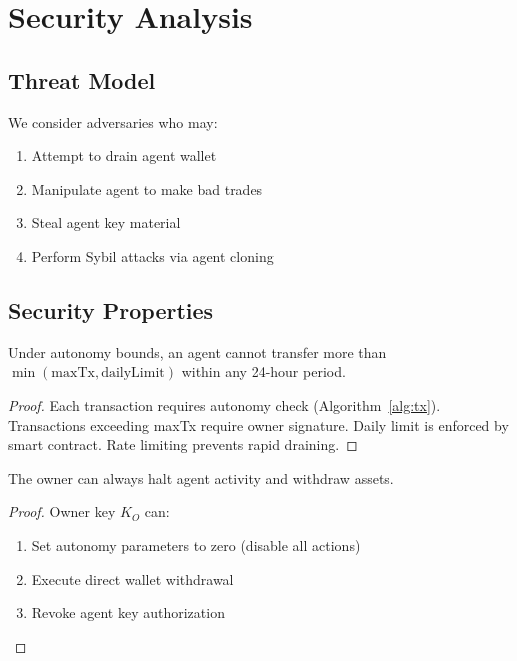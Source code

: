 \section{Security Analysis}

\label{sec:security}

\subsection{Threat Model}

We consider adversaries who may:
\begin{enumerate}
    \item Attempt to drain agent wallet
    \item Manipulate agent to make bad trades
    \item Steal agent key material
    \item Perform Sybil attacks via agent cloning
\end{enumerate}

\subsection{Security Properties}

\begin{theorem}
Under autonomy bounds, an agent cannot transfer more than $\min(\text{maxTx}, \text{dailyLimit})$ within any 24-hour period.
\end{theorem}

\begin{proof}
Each transaction requires autonomy check (Algorithm~\ref{alg:tx}). Transactions exceeding maxTx require owner signature. Daily limit is enforced by smart contract. Rate limiting prevents rapid draining.
\end{proof}

\begin{theorem}
The owner can always halt agent activity and withdraw assets.
\end{theorem}

\begin{proof}
Owner key $K_O$ can:
\begin{enumerate}
    \item Set autonomy parameters to zero (disable all actions)
    \item Execute direct wallet withdrawal
    \item Revoke agent key authorization
\end{enumerate}
\end{proof}

